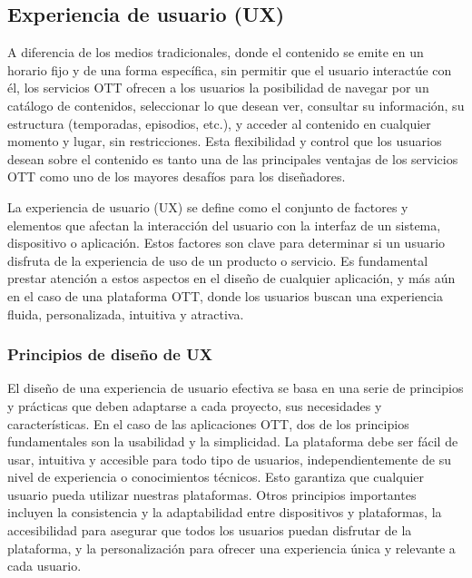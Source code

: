 \subsection{Experiencia de usuario (UX)}
\label{sec:fundamentos_teoricos_ux}

A diferencia de los medios tradicionales, donde el contenido se emite en un horario fijo y de una forma específica, 
sin permitir que el usuario interactúe con él, los servicios OTT ofrecen a los usuarios la posibilidad de navegar 
por un catálogo de contenidos, seleccionar lo que desean ver, consultar su información, su estructura (temporadas, 
episodios, etc.), y acceder al contenido en cualquier momento y lugar, sin restricciones. Esta flexibilidad y 
control que los usuarios desean sobre el contenido es tanto una de las principales ventajas de los servicios OTT 
como uno de los mayores desafíos para los diseñadores.

La experiencia de usuario (UX) \cite{UX} se define como el conjunto de factores y elementos que afectan la 
interacción del usuario con la interfaz de un sistema, dispositivo o aplicación. Estos factores son clave 
para determinar si un usuario disfruta de la experiencia de uso de un producto o servicio. Es fundamental 
prestar atención a estos aspectos en el diseño de cualquier aplicación, y más aún en el caso de una plataforma 
OTT, donde los usuarios buscan una experiencia fluida, personalizada, intuitiva y atractiva.

\subsubsection{Principios de diseño de UX}
\label{subsec:fundamentos_teoricos_ux_principios}

El diseño de una experiencia de usuario efectiva se basa en una serie de principios y prácticas que deben 
adaptarse a cada proyecto, sus necesidades y características. En el caso de las aplicaciones OTT, dos de los 
principios fundamentales son la usabilidad y la simplicidad. La plataforma debe ser fácil de usar, intuitiva 
y accesible para todo tipo de usuarios, independientemente de su nivel de experiencia o conocimientos técnicos. 
Esto garantiza que cualquier usuario pueda utilizar nuestras plataformas. Otros principios importantes incluyen 
la consistencia y la adaptabilidad entre dispositivos y plataformas, la accesibilidad para asegurar que todos 
los usuarios puedan disfrutar de la plataforma, y la personalización para ofrecer una experiencia única y 
relevante a cada usuario.

